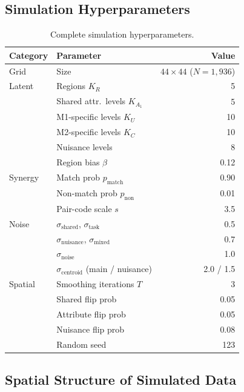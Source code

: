 \documentclass{article}
\theoremstyle{plain}
\theoremstyle{definition}
\begin{document}
\subsection{Simulation Hyperparameters}

\begin{table}[H]
\centering
\caption{Complete simulation hyperparameters.}
\label{tab:sim-hyperparams}
\small
\begin{tabular}{llr}
\toprule
Category & Parameter & Value \\
\midrule
Grid        & Size & $44 \times 44$ ($N{=}1{,}936$) \\
\midrule
Latent      & Regions $K_R$ & 5 \\
            & Shared attr.\ levels $K_{A_1}$ & 5 \\
            & M1-specific levels $K_U$ & 10 \\
            & M2-specific levels $K_C$ & 10 \\
            & Nuisance levels & 8 \\
            & Region bias $\beta$ & 0.12 \\
\midrule
Synergy     & Match prob $p_\text{match}$ & 0.90 \\
            & Non-match prob $p_\text{non}$ & 0.01 \\
            & Pair-code scale $s$ & 3.5 \\
\midrule
Noise       & $\sigma_\text{shared}$, $\sigma_\text{task}$ & 0.5 \\
            & $\sigma_\text{nuisance}$, $\sigma_\text{mixed}$ & 0.7 \\
            & $\sigma_\text{noise}$ & 1.0 \\
            & $\sigma_\text{centroid}$ (main / nuisance) & 2.0 / 1.5 \\
\midrule
Spatial     & Smoothing iterations $T$ & 3 \\
            & Shared flip prob & 0.05 \\
            & Attribute flip prob & 0.05 \\
            & Nuisance flip prob & 0.08 \\
\midrule
            & Random seed & 123 \\
\bottomrule
\end{tabular}
\end{table}

\subsection{Spatial Structure of Simulated Data}\label{app:spatial}
\end{document}
